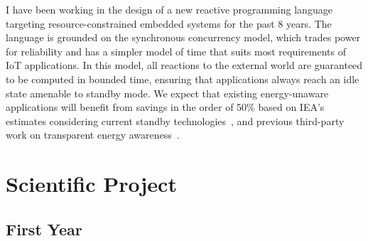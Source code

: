 \documentclass[12pt,english]{amsart}
\begin{document}
I have been working in the design of a new reactive programming language
targeting resource-constrained embedded systems for the past 8 years.
%
The language is grounded on the synchronous concurrency model,
%
which trades power for reliability and has a simpler model
of time that suits most requirements of IoT applications.
%
%
In this model, all reactions to the external world are guaranteed to be
computed in bounded
time, ensuring that applications always reach an idle state amenable to standby
mode.
%
%
%
We expect that existing energy-unaware applications will benefit from savings
in the order of 50\% based on IEA's estimates considering current standby
technologies~\cite{iea.data}, and previous third-party work on transparent energy
awareness~\cite{wsn.tos.2}.

\section{Scientific Project}

\subsection{First Year}
\label{sec.first}
\end{document}
